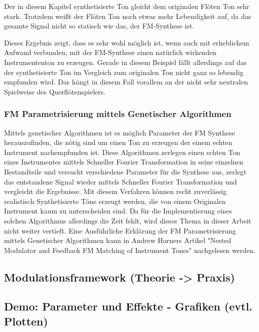 Der in diesem Kapitel synthetisierte Ton gleicht dem originalen Flöten Ton sehr stark. Trotzdem weißt der Flöten Ton noch etwas mehr Lebendigkeit auf, da das gesamte Signal nicht so statisch wie das, der FM-Synthese ist. 

Dieses Ergebnis zeigt, dass es sehr wohl möglich ist, wenn auch mit erheblichem Aufwand verbunden, mit der FM-Synthese einen natürlich wirkenden Instrumententon zu erzeugen. Gerade in diesem Beispiel fällt allerdings auf das der synthetisierte Ton im Vergleich zum originalen Ton nicht ganz so lebendig empfunden wird. Das hängt in diesem Fall vorallem an der nicht sehr neutralen Spielweise des Querflötenspielers.


\FloatBarrier
\subsubsection{FM Parametrisierung mittels Genetischer Algorithmen}

Mittels genetischer Algorithmen ist es möglich Parameter der FM Synthese herauszufinden, die nötig sind um einen Ton zu erzeugen der einem echten Instrument nachempfunden ist. Diese Algorithmen zerlegen einen echten Ton eines Instrumentes mittels Schneller Fourier Transformation in seine einzelnen Bestandteile und versucht verschiedene Parameter für die Synthese aus, zerlegt das entstandene Signal wieder mittels Schneller Fourier Transformation und vergleicht die Ergebnisse. Mit diesem Verfahren können recht zuverlässig realistisch Synthetisierte Töne erzeugt werden, die von einem Originalen Instrument kaum zu unterscheiden sind. Da für die Implementierung eines solchen Algorithmus allerdings die Zeit fehlt, wird dieses Thema in dieser Arbeit nicht weiter vertieft. Eine Ausführliche Erklärung der FM Parametrisierung mittels Genetischer Algorithmen kann in Andrew Horners Artikel "Nested Modulator and Feedback FM Matching of Instrument Tones" nachgelesen werden.

\FloatBarrier
\subsection{Modulationsframework (Theorie -> Praxis)}
\FloatBarrier
\subsection{Demo: Parameter und Effekte - Grafiken (evtl. Plotten)}